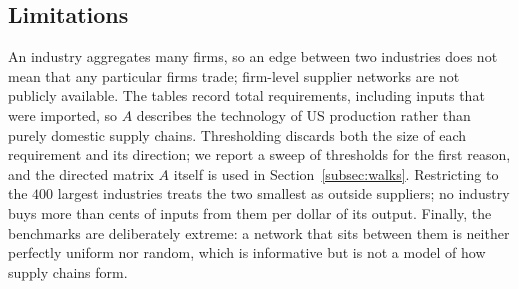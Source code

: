 \subsection{Limitations}
\label{subsec:supply-limits}

An industry aggregates many firms, so an edge between two industries does not
mean that any particular firms trade; firm-level supplier networks are not
publicly available. The tables record total requirements, including inputs
that were imported, so $A$ describes the technology of US production rather
than purely domestic supply chains. Thresholding discards both the size of
each requirement and its direction; we report a sweep of thresholds for the
first reason, and the directed matrix $A$ itself is used in
Section~\ref{subsec:walks}. Restricting to the $400$ largest industries treats
the two smallest as outside suppliers; no industry buys more than
\DroppedShare{} cents of inputs from them per dollar of its output. Finally, the benchmarks are deliberately extreme: a
network that sits between them is neither perfectly uniform nor random, which
is informative but is not a model of how supply chains form.
